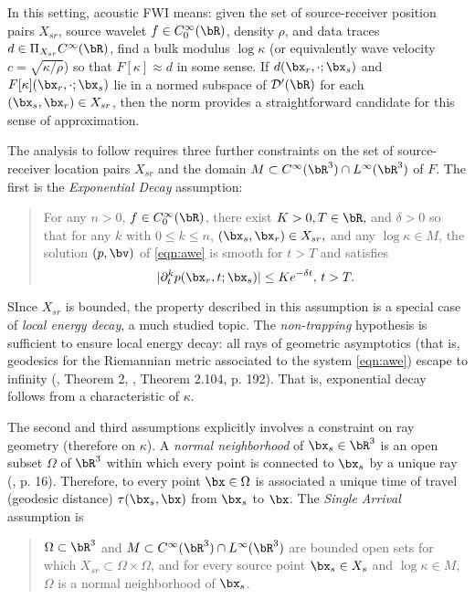 In this setting, acoustic FWI means: given the set of
source-receiver position pairs $X_{sr}$, source wavelet
$f \in C_0^{\infty}(\bR)$,  density $\rho$, and data traces
$d \in \Pi_{X_{sr}} C^{\infty}(\bR)$, find a bulk modulus $\log
\kappa$
(or equivalently wave velocity $c=\sqrt{\kappa/\rho}$)
so that $F[\kappa] \approx d$ in some sense. If
$d(\bx_r,\cdot;\bx_s)$ and $F[\kappa](\bx_r,\cdot;\bx_s)$ lie in a normed subspace of ${\cal D}'(\bR)$ for each
$(\bx_s,\bx_r) \in X_{sr}$, then the
norm provides a straightforward candidate for this sense of
approximation.

The analysis to follow requires three further constraints on the set
of source-receiver location pairs $X_{sr}$ and the domain
$M \subset C^{\infty}(\bR^3) \cap L^{\infty}(\bR^3)$ of $F$. The first is
the {\em Exponential Decay} assumption:
\begin{quote}
  For any $n > 0$, $f \in C_0^{\infty}(\bR)$,
  there exist $K >
  0, T \in \bR,$ and $\delta>0$ so
  that for any $k$ with $0 \le k \le n$, $(\bx_s,\bx_r) \in
 X_{sr},$ and any $\log \kappa \in M$, the solution $(p,\bv)$ of \ref{eqn:awe} is smooth
  for $t>T$ and satisfies
  \[
    |\partial_t^k p(\bx_r,t;\bx_s)| \le K e^{-\delta t}, \, t > T.
  \]
\end{quote}
SInce $X_{sr}$ is bounded, the property described in this assumption
is a special case of {\em local energy decay}, a much studied topic. The {\em
  non-trapping} hypothesis is sufficient to ensure local energy decay:
all rays of geometric asymptotics (that is, geodesics for the Riemannian metric associated
to the system \ref{eqn:awe}) escape to infinity (\cite{Hristova:09},
Theorem 2, \cite{EgorovShubin}, Theorem 2.104, p. 192). That is,
exponential decay follows from a characteristic of $\kappa$.

The second and third assumptions explicitly involves a constraint on ray geometry
(therefore on $\kappa$). A {\em normal neighborhood} of
$\bx_s \in \bR^3$ is an open subset $\Omega$ of $\bR^3$ 
within which every point is connected to $\bx_s$ by  a unique ray  (\cite{Friedlander:75},
p. 16). Therefore, to every point $\bx \in \Omega$ is associated a
unique time of travel (geodesic distance) $\tau(\bx_s,\bx)$ from $\bx_s$ to $\bx$.
The {\em Single Arrival} assumption is
\begin{quote}
  $\Omega\subset \bR^3$ and $M \subset C^{\infty}(\bR^3) \cap
  L^{\infty}(\bR^3)$ are bounded open sets for which $X_{sr} \subset
  \Omega \times \Omega$, and for every source point $\bx_s\in X_{s}$
  and $\log \kappa \in M$, $\Omega$ is a normal neighborhood of
  $\bx_s$.
\end{quote}

